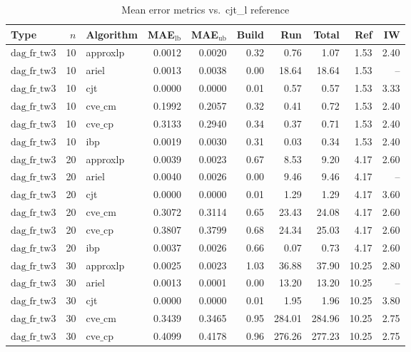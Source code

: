 \begin{table}[ht]
\centering
\scriptsize
\caption{Mean error metrics vs.\ cjt_l reference}
\begin{tabular}{lrlrrrrrrr}
\toprule
Type & $n$ & Algorithm & MAE$_{\text{lb}}$ & MAE$_{\text{ub}}$ & Build & Run & Total & Ref & IW \\
\midrule
$\text{dag\_fr\_tw3}$ & 10 & approxlp & 0.0012 & 0.0020 & 0.32 & 0.76 & 1.07 & 1.53 & 2.40 \\
$\text{dag\_fr\_tw3}$ & 10 & ariel & 0.0013 & 0.0038 & 0.00 & 18.64 & 18.64 & 1.53 & -- \\
$\text{dag\_fr\_tw3}$ & 10 & cjt & 0.0000 & 0.0000 & 0.01 & 0.57 & 0.57 & 1.53 & 3.33 \\
$\text{dag\_fr\_tw3}$ & 10 & $\text{cve\_cm}$ & 0.1992 & 0.2057 & 0.32 & 0.41 & 0.72 & 1.53 & 2.40 \\
$\text{dag\_fr\_tw3}$ & 10 & $\text{cve\_cp}$ & 0.3133 & 0.2940 & 0.34 & 0.37 & 0.71 & 1.53 & 2.40 \\
$\text{dag\_fr\_tw3}$ & 10 & ibp & 0.0019 & 0.0030 & 0.31 & 0.03 & 0.34 & 1.53 & 2.40 \\
$\text{dag\_fr\_tw3}$ & 20 & approxlp & 0.0039 & 0.0023 & 0.67 & 8.53 & 9.20 & 4.17 & 2.60 \\
$\text{dag\_fr\_tw3}$ & 20 & ariel & 0.0040 & 0.0026 & 0.00 & 9.46 & 9.46 & 4.17 & -- \\
$\text{dag\_fr\_tw3}$ & 20 & cjt & 0.0000 & 0.0000 & 0.01 & 1.29 & 1.29 & 4.17 & 3.60 \\
$\text{dag\_fr\_tw3}$ & 20 & $\text{cve\_cm}$ & 0.3072 & 0.3114 & 0.65 & 23.43 & 24.08 & 4.17 & 2.60 \\
$\text{dag\_fr\_tw3}$ & 20 & $\text{cve\_cp}$ & 0.3807 & 0.3799 & 0.68 & 24.34 & 25.03 & 4.17 & 2.60 \\
$\text{dag\_fr\_tw3}$ & 20 & ibp & 0.0037 & 0.0026 & 0.66 & 0.07 & 0.73 & 4.17 & 2.60 \\
$\text{dag\_fr\_tw3}$ & 30 & approxlp & 0.0025 & 0.0023 & 1.03 & 36.88 & 37.90 & 10.25 & 2.80 \\
$\text{dag\_fr\_tw3}$ & 30 & ariel & 0.0013 & 0.0001 & 0.00 & 13.20 & 13.20 & 10.25 & -- \\
$\text{dag\_fr\_tw3}$ & 30 & cjt & 0.0000 & 0.0000 & 0.01 & 1.95 & 1.96 & 10.25 & 3.80 \\
$\text{dag\_fr\_tw3}$ & 30 & $\text{cve\_cm}$ & 0.3439 & 0.3465 & 0.95 & 284.01 & 284.96 & 10.25 & 2.75 \\
$\text{dag\_fr\_tw3}$ & 30 & $\text{cve\_cp}$ & 0.4099 & 0.4178 & 0.96 & 276.26 & 277.23 & 10.25 & 2.75 \\

\end{tabular}
\end{table}
